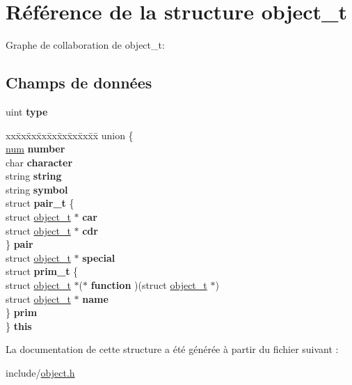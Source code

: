 \hypertarget{structobject__t}{}\section{Référence de la structure object\+\_\+t}
\label{structobject__t}


Graphe de collaboration de object\+\_\+t\+:
\subsection*{Champs de données}
\begin{DoxyCompactItemize}
\item 
uint {\bfseries type}\hypertarget{structobject__t_a92c5cda86022a69772cb8b6edba7530c}{}\label{structobject__t_a92c5cda86022a69772cb8b6edba7530c}

\item 
\begin{tabbing}
xx\=xx\=xx\=xx\=xx\=xx\=xx\=xx\=xx\=\kill
union \{\\
\>\hyperlink{structnum__t}{num} {\bfseries number}\\
\>char {\bfseries character}\\
\>string {\bfseries string}\\
\>string {\bfseries symbol}\\
\>struct {\bfseries pair\_t} \{\\
\>\>struct \hyperlink{structobject__t}{object\_t} $\ast$ {\bfseries car}\\
\>\>struct \hyperlink{structobject__t}{object\_t} $\ast$ {\bfseries cdr}\\
\>\} {\bfseries pair}\\
\>struct \hyperlink{structobject__t}{object\_t} $\ast$ {\bfseries special}\\
\>struct {\bfseries prim\_t} \{\\
\>\>struct \hyperlink{structobject__t}{object\_t} $\ast$($\ast$ {\bfseries function} )(struct \hyperlink{structobject__t}{object\_t} $\ast$)\\
\>\>struct \hyperlink{structobject__t}{object\_t} $\ast$ {\bfseries name}\\
\>\} {\bfseries prim}\\
\} {\bfseries this}\hypertarget{structobject__t_ace8394a5a873527066c787412642bef1}{}\label{structobject__t_ace8394a5a873527066c787412642bef1}
\\

\end{tabbing}\end{DoxyCompactItemize}


La documentation de cette structure a été générée à partir du fichier suivant \+:\begin{DoxyCompactItemize}
\item 
include/\hyperlink{object_8h}{object.\+h}\end{DoxyCompactItemize}
